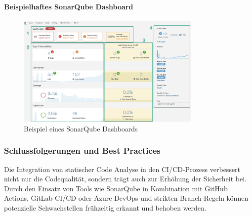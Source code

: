 \paragraph{Beispielhaftes SonarQube Dashboard}

\begin{figure}[h!]
\centering
\includegraphics[width=0.8\textwidth]{img/sonarqube_dashboard.png}
\caption{Beispiel eines SonarQube Dashboards}
\label{fig:sonarqube_dashboard}
\end{figure}

\subsubsection{Schlussfolgerungen und Best Practices}

Die Integration von statischer Code Analyse in den CI/CD-Prozess verbessert nicht nur die Codequalität, sondern trägt auch zur Erhöhung der Sicherheit bei. Durch den Einsatz von Tools wie SonarQube in Kombination mit GitHub Actions, GitLab CI/CD oder Azure DevOps und strikten Branch-Regeln können potenzielle Schwachstellen frühzeitig erkannt und behoben werden.
